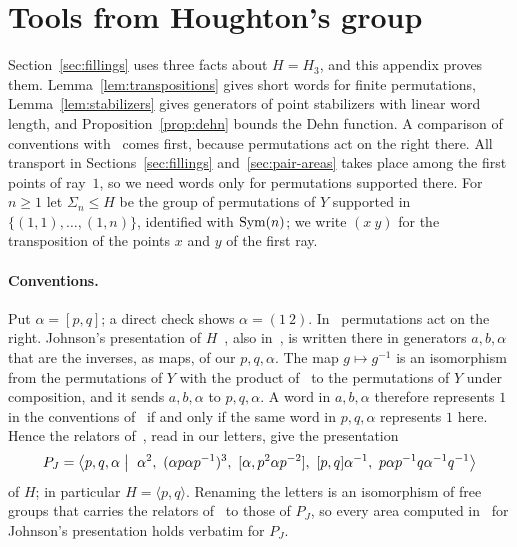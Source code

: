\section{Tools from Houghton's group}\label{sec:houghton}

Section~\ref{sec:fillings} uses three facts about $H=H_3$, and this appendix proves them. Lemma~\ref{lem:transpositions} gives short words for
finite permutations, Lemma~\ref{lem:stabilizers} gives generators of point stabilizers with linear word length, and
Proposition~\ref{prop:dehn} bounds the Dehn function. A comparison of conventions with~\cite{DouglasMghirbiA} comes first, because permutations
act on the right there. All transport in Sections~\ref{sec:fillings} and~\ref{sec:pair-areas} takes place among the first points of ray~$1$, so
we need words only for permutations supported there. For $n\ge1$ let $\Sigma_n\le H$ be the group of permutations of $Y$ supported in
$\{(1,1),\dots,(1,n)\}$, identified with $\operatorname{Sym}(n)$; we write $(x\ y)$ for the transposition of the points $x$ and $y$ of the first ray.

\paragraph{Conventions.} Put $\alpha=[p,q]$; a direct check shows $\alpha=(1\ 2)$. In~\cite{DouglasMghirbiA} permutations act on the right.
Johnson's presentation of $H$~\cite{Johnson1999}, also in~\cite[Theorem~2.8]{Lee2012}, is written there in generators $a,b,\alpha$ that are the
inverses, as maps, of our $p,q,\alpha$. The map $g\mapsto g^{-1}$ is an isomorphism from the permutations of $Y$ with the product
of~\cite{DouglasMghirbiA} to the permutations of $Y$ under composition, and it sends $a,b,\alpha$ to $p,q,\alpha$. A word in $a,b,\alpha$
therefore represents $1$ in the conventions of~\cite{DouglasMghirbiA} if and only if the same word in $p,q,\alpha$ represents $1$ here. Hence
the relators of~\cite[Section~2]{DouglasMghirbiA}, read in our letters, give the presentation
\begin{equation}\label{eq:johnson}
P_J=\bigl\langle p,q,\alpha\bigm|\ \alpha^2,\ (\alpha p\alpha p^{-1})^3,\ [\alpha,p^2\alpha p^{-2}],\ [p,q]\alpha^{-1},\ p\alpha p^{-1}q\alpha^{-1}q^{-1}\bigr\rangle
\end{equation}
of $H$; in particular $H=\langle p,q\rangle$. Renaming the letters is an isomorphism of free groups that carries the relators
of~\cite{DouglasMghirbiA} to those of $P_J$, so every area computed in~\cite{DouglasMghirbiA} for Johnson's presentation holds verbatim for $P_J$.


